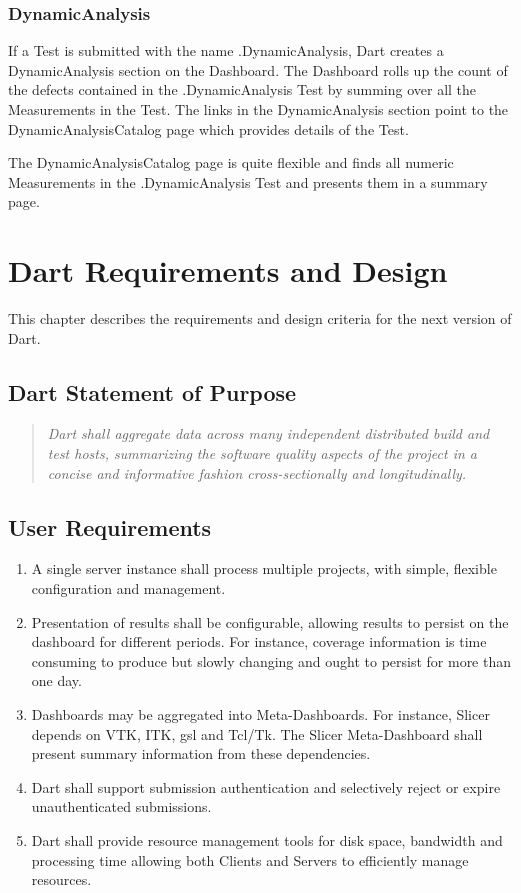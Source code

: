 \documentclass{InsightBook}
\begin{document}
\subsection{DynamicAnalysis}
If a Test is submitted with the name .DynamicAnalysis, Dart creates a
DynamicAnalysis section on the Dashboard.  The Dashboard rolls up the
count of the defects contained in the .DynamicAnalysis Test by summing
over all the Measurements in the Test.  The links in the
DynamicAnalysis section point to the DynamicAnalysisCatalog page which
provides details of the Test.

The DynamicAnalysisCatalog page is quite flexible and finds all
numeric Measurements in the .DynamicAnalysis Test and presents them in
a summary page.



\chapter{Dart Requirements and Design}
This chapter describes the requirements and design criteria for the
next version of Dart.

\section{Dart Statement of Purpose}
\begin{quote}
\emph{Dart shall aggregate data across many independent distributed
build and test hosts, summarizing the software quality aspects of the project
in a concise and informative fashion cross-sectionally and longitudinally.}
\end{quote}

\section{User Requirements}
\begin{enumerate}
\item A single server instance shall process multiple projects, with
simple, flexible configuration and management.
\item Presentation of results shall be configurable, allowing results
to persist on the dashboard for different periods.  For instance,
coverage information is time consuming to produce but slowly
changing and ought to persist for more than one day.
\item Dashboards may be aggregated into Meta-Dashboards.  For
instance, Slicer depends on VTK, ITK, gsl and Tcl/Tk.  The Slicer
Meta-Dashboard shall present summary information from these
dependencies.
\item Dart shall support submission authentication and selectively
reject or expire unauthenticated submissions.
\item Dart shall provide resource management tools for disk space,
bandwidth and processing time allowing both Clients and Servers to
efficiently manage resources.
\end{enumerate}
\end{document}
